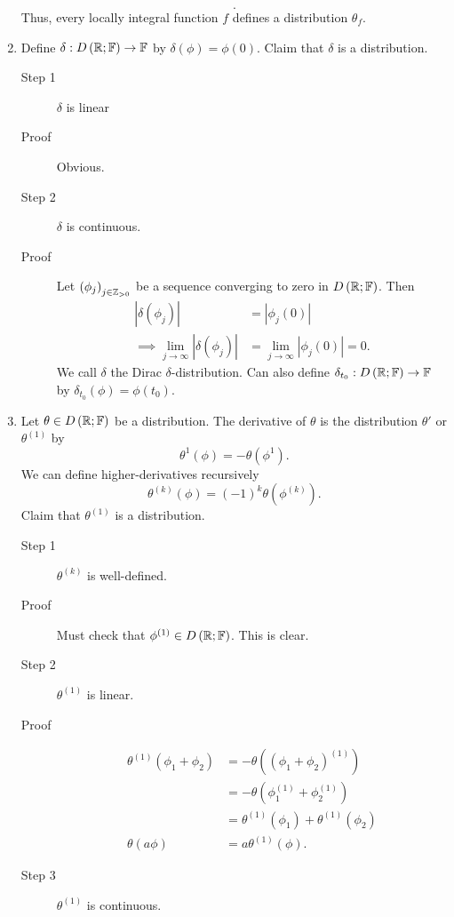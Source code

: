 \begin{example}
\begin{enumerate}
\[		.\] 
		Thus, every locally integral function $f$ defines a distribution $\theta _{f}$. 
	\item Define $\delta : D\left( \mathbb{R}; \mathbb{F} \right)  \to \mathbb{F}$ by $\delta\left( \phi \right)  = \phi\left( 0 \right) $. Claim that $\delta$ is a distribution. 
		\begin{description}
			\item[Step 1] $\delta $ is linear
			\item[Proof] Obvious. 
			\item[Step 2] $\delta$ is continuous. 
			\item[Proof] Let $\left( \phi_{j} \right) _{j \in  \mathbb{Z}_{>0}}$ be a sequence converging to zero in $D\left( \mathbb{R}; \mathbb{F} \right) $. Then 
				\begin{align*}
					|		\delta\left( \phi_{j} \right) | &=  |\phi_{j}\left( 0  \right) | \\
					\implies \lim_{j \to \infty} \left| \delta\left( \phi_j \right)  \right|  &= \lim_{j \to \infty} \left| \phi_{j}\left( 0 \right)  \right|  = 0
				.\end{align*}
				We call  $\delta$ the Dirac $\delta$-distribution. Can also define $\delta_{t_0} : D\left( \mathbb{R}; \mathbb{F} \right)  \to \mathbb{F} $ by $\delta_{t_0} \left( \phi \right) = \phi\left( t_0 \right) $. 
		\end{description}
	\item Let $\theta \in  D\left( \mathbb{R}; \mathbb{F} \right) $ be a distribution. The derivative of $\theta$ is the distribution $\theta '$ or $\theta ^{\left( 1 \right) }$ by 
		\[
			\theta ^{1}\left( \phi \right)  = -\theta\left( \phi^{1} \right) 
		.\] 
		We can define higher-derivatives recursively 
		\[
			\theta^{\left( k \right) } \left( \phi \right)  = \left( -1  \right) ^{k} \theta \left( \phi^{\left( k \right) } \right) 
		.\] 
		Claim that $\theta^{\left( 1 \right) }$ is a distribution. 
		\begin{description}
			\item[Step 1] $\theta^{\left( k \right) }$ is well-defined. 
			\item[Proof] Must check that $\phi^{\left( 1 \right) }\in D\left( \mathbb{R}; \mathbb{F} \right) $. This is clear. 
			\item[Step 2] $\theta ^{\left( 1 \right) }$ is linear. 
			\item[Proof] 
				\begin{align*}
					\theta^{\left( 1 \right) } \left( \phi_{1} + \phi_2 \right) &= - \theta \left( \left( \phi_1 + \phi_2 \right) ^{\left( 1 \right) } \right)  \\
													  &= -\theta \left( \phi_1^{\left( 1 \right) } + \phi_2 ^{\left( 1 \right) } \right)  \\
													  &= \theta^{\left( 1 \right) } \left( \phi_1 \right)   + \theta^{\left( 1 \right) } \left( \phi_2 \right) \\
					\theta\left( a\phi \right)  &= a \theta^{\left( 1 \right) } \left( \phi \right) 
				.\end{align*}
			\item[Step 3] $\theta^{\left( 1 \right) }$ is continuous. 
				

\end{description}
\end{enumerate}
\end{example}
